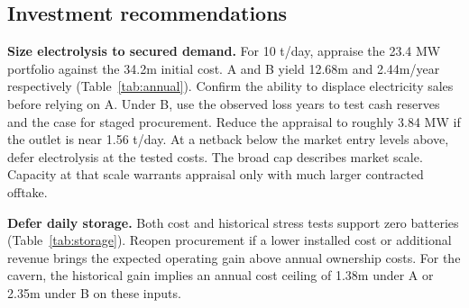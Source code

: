 \subsection{Investment recommendations}\label{sec:recommendations1}
\textbf{Size electrolysis to secured demand.}
For 10 t/day, appraise the 23.4 MW portfolio against the \gbp 34.2m
initial cost. A and B yield \gbp 12.68m and \gbp 2.44m/year respectively
(Table~\ref{tab:annual}). Confirm the ability to displace electricity
sales before relying on A. Under B, use the observed loss years to test
cash reserves and the case for staged procurement. Reduce the appraisal to roughly
3.84 MW if the outlet is near 1.56 t/day. At a netback below the
market entry levels above, defer electrolysis at the tested costs.
The broad cap describes market scale. Capacity at that scale warrants
appraisal only with much larger contracted offtake.

\textbf{Defer daily storage.}
Both cost and historical stress tests support zero batteries
(Table~\ref{tab:storage}). Reopen procurement if a lower installed cost
or additional revenue brings the expected operating gain above annual
ownership costs. For the cavern, the historical gain implies an annual
cost ceiling of \gbp 1.38m under A or \gbp 2.35m under B on these inputs.
